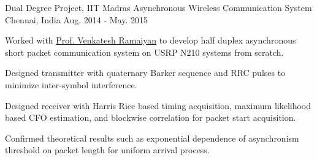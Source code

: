\begin{cventries}
	\cventry
	{Dual Degree Project, IIT Madras}
	{Asynchronous Wireless Communication System}
	{Chennai, India}
	{Aug. 2014 - May. 2015}
	{
		\begin{cvitems}
		\item{Worked with \href{http://www.ee.iitm.ac.in/~rvenkat/}{Prof. Venkatesh Ramaiyan} to develop half duplex asynchronous short packet communication system on USRP N210 systems from scratch.}
		\item{Designed transmitter with quaternary Barker sequence and RRC pulses to minimize inter-symbol interference.}
		\item{Designed receiver with Harris Rice based timing acquisition, maximum likelihood based CFO estimation, and blockwise correlation for packet start acquisition.}
		\item{Confirmed theoretical results such as exponential dependence of asynchronism threshold on packet length for uniform arrival process.}
		\end{cvitems}
	}

\end{cventries}
